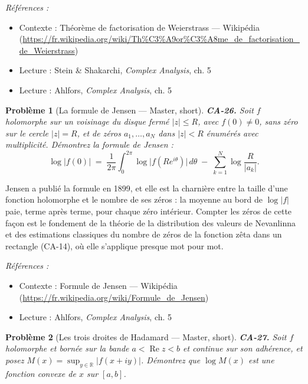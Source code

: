 \documentclass[11pt]{article}
\newtheorem{problem}{Problème}
\newenvironment{refs}{\par\small\noindent\emph{Références :}\begin{itemize}\setlength\itemsep{0pt}}{\end{itemize}\normalsize}
\begin{document}
\begin{refs}
\item Contexte : Théorème de factorisation de Weierstrass --- Wikipédia (\url{https://fr.wikipedia.org/wiki/Th%C3%A9or%C3%A8me_de_factorisation_de_Weierstrass})
\item Lecture : Stein \& Shakarchi, \textit{Complex Analysis}, ch. 5
\item Lecture : Ahlfors, \textit{Complex Analysis}, ch. 5
\end{refs}

\bigskip

\begin{problem}[{La formule de Jensen --- Master, short}]
\textbf{CA-26.} Soit $ f $ holomorphe sur un voisinage du disque fermé
$ |z| \le R $, avec $ f(0) \ne 0 $, sans zéro sur le cercle $ |z| = R $, et de zéros
$ a_1, \dots, a_N $ dans $ |z| < R $ énumérés avec multiplicité. Démontrez la formule de
Jensen :
\[ \log|f(0)| \;=\; \frac{1}{2\pi} \int_0^{2\pi} \log\big|f(Re^{i\theta})\big| \, d\theta \;-\;
\sum_{k=1}^{N} \log \frac{R}{|a_k|}. \]
\end{problem}

\noindent Jensen a publié la formule en 1899, et elle est la charnière entre la taille
d'une fonction holomorphe et le nombre de ses zéros : la moyenne au bord de $ \log|f| $ paie,
terme après terme, pour chaque zéro intérieur. Compter les zéros de cette façon est le fondement de
la théorie de la distribution des valeurs de Nevanlinna et des estimations classiques du nombre de
zéros de la fonction zêta dans un rectangle (CA-14), où elle s'applique presque mot pour mot.

\begin{refs}
\item Contexte : Formule de Jensen --- Wikipédia (\url{https://fr.wikipedia.org/wiki/Formule_de_Jensen})
\item Lecture : Ahlfors, \textit{Complex Analysis}, ch. 5
\end{refs}

\bigskip

\begin{problem}[{Les trois droites de Hadamard --- Master, short}]
\textbf{CA-27.} Soit $ f $ holomorphe et bornée sur la bande
$ a < \operatorname{Re} z < b $ et continue sur son adhérence, et posez
$ M(x) = \sup_{y \in \mathbb{R}} |f(x + iy)| $. Démontrez que $ \log M(x) $ est une fonction
convexe de $ x $ sur $ [a, b] $.
\end{problem}
\end{document}
